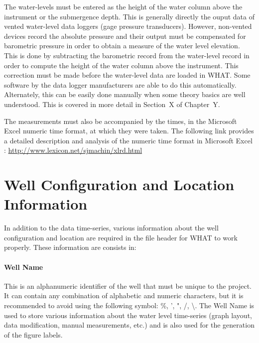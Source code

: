 \documentclass[WHATMANUAL.tex]{subfiles}
\begin{document}

The water-levels must be entered as the height of the water column above the instrument or the submergence depth. This is generally directly the ouput data of vented water-level data loggers (gage pressure transducers). However, non-vented devices record the absolute pressure and their output must be compensated for barometric pressure in order to obtain a measure of the water level elevation. This is done by subtracting the barometric record from the water-level record in order to compute the height of the water column above the instrument. This correction must be made before the water-level data are loaded in WHAT. Some software by the data logger manufacturers are able to do this automatically. Alternately, this can be easily done manually when some theory basics are well understood. This is covered in more detail in Section~X of Chapter~Y.

The measurements must also be accompanied by the times, in the Microsoft Excel numeric time format, at which they were taken. The following link provides a detailed description and analysis of the numeric time format in Microsoft Excel : \url{http://www.lexicon.net/sjmachin/xlrd.html}

\section{Well Configuration and Location Information}

In addition to the data time-series, various information about the well configuration and location are required in the file header for WHAT to work properly. These information are consists in:

\paragraph{Well Name} This is an alphanumeric identifier of the well that must be unique to the project. It can contain any combination of alphabetic and numeric characters, but it is recommended to avoid using the following symbol: \%, ', ", /, \textbackslash. The Well Name is used to store various information about the water level time-series (graph layout, data modification, manual measurements, etc.) and is also used for the generation of the figure labels.
\end{document}
